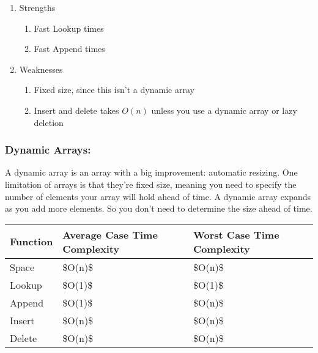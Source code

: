 \documentclass{article}
\begin{document}
\begin{enumerate}
    \item Strengths
    \begin{enumerate}
        \item Fast Lookup times
        \item Fast Append times
    \end{enumerate}
    \item Weaknesses
    \begin{enumerate}
        \item Fixed size, since this isn't a dynamic array
        \item Insert and delete takes $O(n)$ unless you use a dynamic array or lazy deletion
    \end{enumerate}
\end{enumerate}

\subsubsection{Dynamic Arrays:} 
 
A dynamic array is an array with a big improvement: automatic resizing. One limitation of arrays is that they're fixed size, meaning you need to specify the number of elements your array will hold ahead of time. A dynamic array expands as you add more elements. So you don't need to determine the size ahead of time. 


\begin{table}[!ht]
    \centering
    \begin{tabular}{|l|l|l|}
    \hline
        Function & Average Case Time Complexity & Worst Case Time Complexity \\ \hline
        Space & \$O(n)\$ & \$O(n)\$ \\ \hline
        Lookup & \$O(1)\$ & \$O(1)\$ \\ \hline
        Append & \$O(1)\$ & \$O(n)\$ \\ \hline
        Insert & \$O(n)\$ & \$O(n)\$ \\ \hline
        Delete & \$O(n)\$ & \$O(n)\$ \\ \hline
    \end{tabular}
\end{table}
\end{document}
